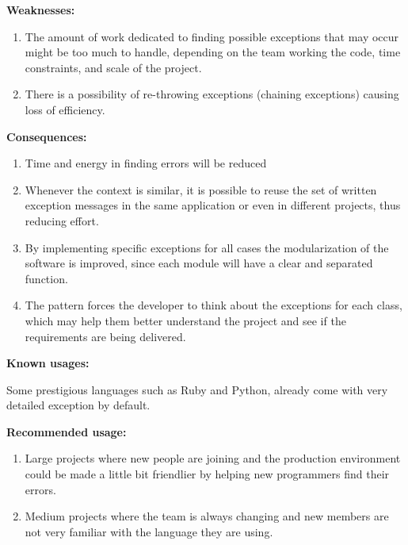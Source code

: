 \documentclass[12pt]{article}
\begin{document}
\begin{flushleft}
\textbf{Weaknesses:}
\end{flushleft}

\begin{enumerate}
\item The amount of work dedicated to finding possible exceptions that may occur might be too much to handle, depending on the team working the code, time constraints, and scale of the project.

\item There is a possibility of re-throwing exceptions (chaining exceptions) causing loss of efficiency.
\end{enumerate}%

\begin{flushleft}
\textbf{Consequences:}
\end{flushleft}

\begin{enumerate}
%
\item Time and energy in finding errors will be reduced
\item Whenever the context is similar, it is possible to reuse the set of written exception messages in the same application or even in different projects, thus reducing effort.
\item By implementing specific exceptions for all cases the modularization of the software is improved, since each module will have a clear and separated function.
\item The pattern forces the developer to think about the exceptions for each class, which may help them better understand the project and see if the requirements are being delivered.
\end{enumerate}

\begin{flushleft}
\textbf{Known usages:}
\end{flushleft}

Some prestigious languages such as Ruby and Python, already come with very detailed exception by default.\newline


\begin{flushleft}
\textbf{Recommended usage:}
\end{flushleft}

\begin{enumerate}
\item Large projects where new people are joining and the production environment could be made a little bit friendlier by helping new programmers find their errors.
\item Medium projects where the team is always changing and new members are not very familiar with the language they are using.
\end{enumerate} 
\end{document}
